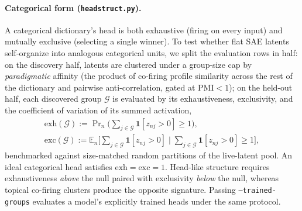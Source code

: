\paragraph{Categorical form (\texttt{headstruct.py}).}
A categorical dictionary's head is both exhaustive (firing on every input)
and mutually exclusive (selecting a single winner). To test whether flat
SAE latents self-organize into analogous categorical units, we split the
evaluation rows in half: on the discovery half, latents are clustered under a
group-size cap by \emph{paradigmatic} affinity (the product of co-firing
profile similarity across the rest of the dictionary and pairwise
anti-correlation, gated at $\mathrm{PMI} < 1$); on the held-out half, each
discovered group $\mathcal{G}$ is evaluated by its exhaustiveness,
exclusivity, and the coefficient of variation of its summed activation,
\begin{equation}
	\begin{gathered}
	\mathrm{exh}(\mathcal{G}) := \Pr\nolimits_n\!\big(\textstyle\sum_{j \in \mathcal{G}} \mathbf{1}[z_{nj} > 0] \ge 1\big),
	\\
	\mathrm{exc}(\mathcal{G}) := \mathbb{E}_n\!\big[\textstyle\sum_{j \in \mathcal{G}} \mathbf{1}[z_{nj} > 0]
	\;\big|\; \textstyle\sum_{j \in \mathcal{G}} \mathbf{1}[z_{nj} > 0] \ge 1\big],
	\end{gathered}
	\label{eq:exhaust}
\end{equation}
benchmarked against size-matched random partitions of the live-latent pool.
An ideal categorical head satisfies $\mathrm{exh} = \mathrm{exc} = 1$.
Head-like structure requires exhaustiveness \emph{above} the null paired
with exclusivity \emph{below} the null, whereas topical co-firing clusters
produce the opposite signature. Passing \texttt{--trained-groups} evaluates
a model's explicitly trained heads under the same protocol.

